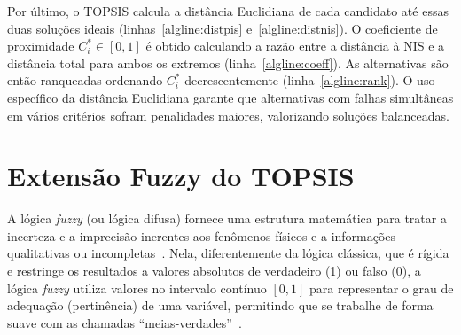Por último, o \gls{TOPSIS} calcula a distância Euclidiana de cada candidato até essas duas soluções ideais (linhas~\ref{algline:distpis} e~\ref{algline:distnis}). O coeficiente de proximidade $C^*_i \in [0,1]$ é obtido calculando a razão entre a distância à NIS e a distância total para ambos os extremos (linha~\ref{algline:coeff}). As alternativas são então ranqueadas ordenando $C^*_i$ decrescentemente (linha~\ref{algline:rank}). O uso específico da distância Euclidiana garante que alternativas com falhas simultâneas em vários critérios sofram penalidades maiores, valorizando soluções balanceadas. 

\section*{Extensão Fuzzy do TOPSIS}
\label{subsec:fuzzy-topsis}

A lógica \textit{fuzzy} (ou lógica difusa) fornece uma estrutura matemática para tratar a incerteza e a imprecisão inerentes aos fenômenos físicos e a informações qualitativas ou incompletas~\cite{zadeh1965fuzzy, cruz2014ciencia}. Nela, diferentemente da lógica clássica, que é rígida e restringe os resultados a valores absolutos de verdadeiro (1) ou falso (0), a lógica \textit{fuzzy} utiliza valores no intervalo contínuo $[0, 1]$ para representar o grau de adequação (pertinência) de uma variável, permitindo que se trabalhe de forma suave com as chamadas ``meias-verdades''~\cite{cruz2014ciencia}.




